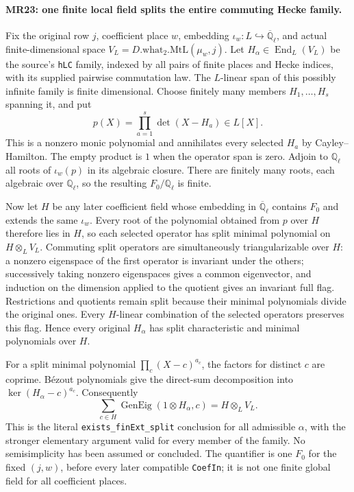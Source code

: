 \paragraph{MR23: one finite local field splits the entire commuting Hecke family.}
Fix the original row $j$, coefficient place $w$, embedding
$\iota_w:L\hookrightarrow\overline{\mathbb Q}_\ell$, and actual
finite-dimensional space
$V_L=D.\mathrm{what}_2.\mathrm{MtL}(\mu_w,j)$.
Let $H_\alpha\in\operatorname{End}_L(V_L)$ be the source's
\texttt{hLC} family, indexed by all pairs of finite places and
Hecke indices, with its supplied pairwise commutation law.
The $L$-linear span of this possibly infinite family is finite
dimensional. Choose finitely many members $H_1,\ldots,H_s$
spanning it, and put
\[
             p(X)=\prod_{a=1}^{s}\det(X-H_a)\in L[X].
                                                               \tag{MR.34}
\]
This is a nonzero monic polynomial and annihilates every selected
$H_a$ by Cayley--Hamilton. The empty product is $1$ when the
operator span is zero. Adjoin to $\mathbb Q_\ell$ all roots of
$\iota_w(p)$ in its algebraic closure. There are finitely many
roots, each algebraic over $\mathbb Q_\ell$, so the resulting
$F_0/\mathbb Q_\ell$ is finite.

Now let $H$ be any later coefficient field whose embedding in
$\overline{\mathbb Q}_\ell$ contains $F_0$ and extends the same
$\iota_w$. Every root of the polynomial obtained from $p$ over
$H$ therefore lies in $H$, so each selected operator has split
minimal polynomial on $H\otimes_LV_L$. Commuting split operators
are simultaneously triangularizable over $H$: a nonzero
eigenspace of the first operator is invariant under the others;
successively taking nonzero eigenspaces gives a common
eigenvector, and induction on the dimension applied to the
quotient gives an invariant full flag. Restrictions and quotients
remain split because their minimal polynomials divide the
original ones. Every $H$-linear combination of the selected
operators preserves this flag. Hence every original $H_\alpha$
has split characteristic and minimal polynomials over $H$.

For a split minimal polynomial
$\prod_c(X-c)^{a_c}$, the factors for distinct $c$ are coprime.
B\'ezout polynomials give the direct-sum decomposition into
$\ker(H_\alpha-c)^{a_c}$. Consequently
\[
 \sum_{c\in H}\operatorname{GenEig}(1\otimes H_\alpha,c)
          =H\otimes_LV_L.                              \tag{MR.35}
\]
This is the literal \texttt{exists\_finExt\_split} conclusion
for all admissible $\alpha$, with the stronger elementary
argument valid for every member of the family. No semisimplicity
has been assumed or concluded. The quantifier is one $F_0$ for
the fixed $(j,w)$, before every later compatible \texttt{CoefIn};
it is not one finite global field for all coefficient places.

